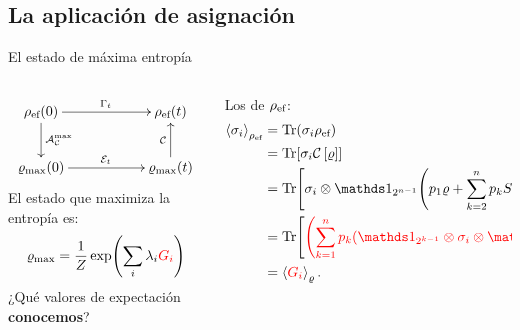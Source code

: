 \subsection{La aplicación de asignación}
\begin{frame}{El estado de máxima entropía}
    \begin{columns}
        \begin{column}{0.5\textwidth}
            \begin{displaymath}
                \xymatrix{
                  {\rho_{\ef}(0)} \ar[rr]^{\Gamma_{t}} \ar[d]^{\mcA_{\mcC}^{\max}}
                  && {\rho_{\ef}(t)}\\
                  {\varrho_{\max}(0)} \ar[rr]^{\mcE_{t}}
                  && {\varrho_{\max}(t)} \ar[u]^{\mcC}
                }
              \end{displaymath}\pause
              El estado que maximiza la entropía es:
              \begin{equation}
                  \varrho_{\max}=\frac{1}{Z}\exp(\sum_{i}\lambda_{i}{\color{red}G_{i}})\nonumber
              \end{equation}\pause
              ¿Qué valores de expectación \textbf{conocemos}?
        \end{column}
        \pause
        \begin{column}{0.5\textwidth}
            Los de $\rho_{\text{ef}}$\pause:
            \begin{align}
                \expval{\pauli{i}}_{\rho_{\ef}}&=\Tr(\pauli{i}\rho_{\ef})\pause\nonumber\\
                &=\Tr[\sigma_{i}\CG{\varrho}]\pause\nonumber\\
                &=\Tr[\sigma_{i}\otimes\Id_{2^{n-1}}\pause\qty(p_{1}\varrho+\sum_{k=2}^{n}p_{k}S_{1,k}\varrho S_{1,k})]\pause\nonumber\\
                &=\Tr[{\color{red}\qty(\sum_{k=1}^{n}p_{k}(\Id_{2^{k-1}}\otimes\sigma_{i}\otimes\Id_{2^{n-k}}))}\varrho]\pause\nonumber\\
                &=\expval{{\color{red}G_{i}}}_{\varrho}.\nonumber
            \end{align}
        \end{column}
    \end{columns}
\end{frame}
